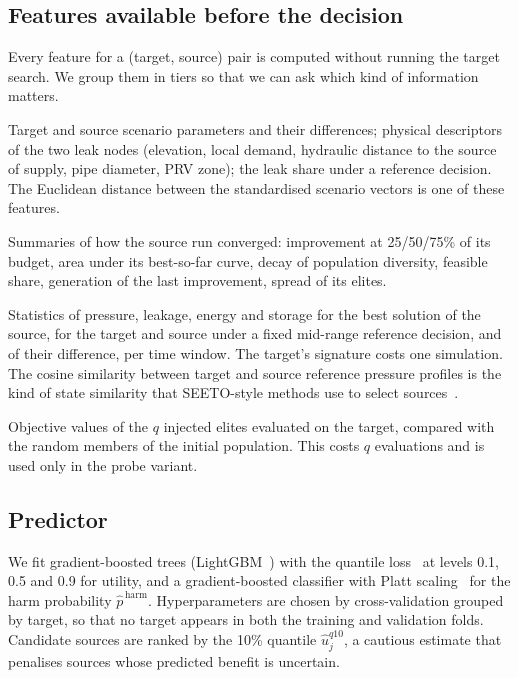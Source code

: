 \documentclass[11pt]{article}
\begin{document}
\subsection{Features available before the decision}\label{sec:features}

Every feature for a (target, source) pair is computed without running the target search. We group them in tiers so
that we can ask which kind of information matters.
\begin{description}[leftmargin=0pt]
  \item[Tier a, scenario facts (28 features).] Target and source scenario parameters and their differences; physical
        descriptors of the two leak nodes (elevation, local demand, hydraulic distance to the source of supply, pipe
        diameter, PRV zone); the leak share under a reference decision. The Euclidean distance between the
        standardised scenario vectors is one of these features.
  \item[Tier b, source trajectory (13).] Summaries of how the source run converged: improvement at 25/50/75\% of its
        budget, area under its best-so-far curve, decay of population diversity, feasible share, generation of the
        last improvement, spread of its elites.
  \item[Tier c, hydraulic signatures (78).] Statistics of pressure, leakage, energy and storage for the best
        solution of the source, for the target and source under a fixed mid-range reference decision, and of their difference, per
        time window. The target's signature costs one simulation. The cosine similarity between target and source
        reference pressure profiles is the kind of state similarity that SEETO-style methods use to select
        sources~\citep{fang2026seeto}.
  \item[Tier d, probe (optional).] Objective values of the $q$ injected elites evaluated on the target, compared with
        the random members of the initial population. This costs $q$ evaluations and is used only in the probe
        variant.
\end{description}

\subsection{Predictor}
We fit gradient-boosted trees (LightGBM~\citep{ke2017lightgbm}) with the quantile loss~\citep{koenker1978quantiles}
at levels 0.1, 0.5 and 0.9 for utility, and a gradient-boosted classifier with Platt scaling~\citep{platt1999probabilistic}
for the harm probability $\hat p^{\,\mathrm{harm}}$. Hyperparameters are chosen by cross-validation grouped by target, so
that no target appears in both the training and validation folds. Candidate sources are ranked by the 10\% quantile
$\hat u^{q10}_j$, a cautious estimate that penalises sources whose predicted benefit is uncertain.
\end{document}
